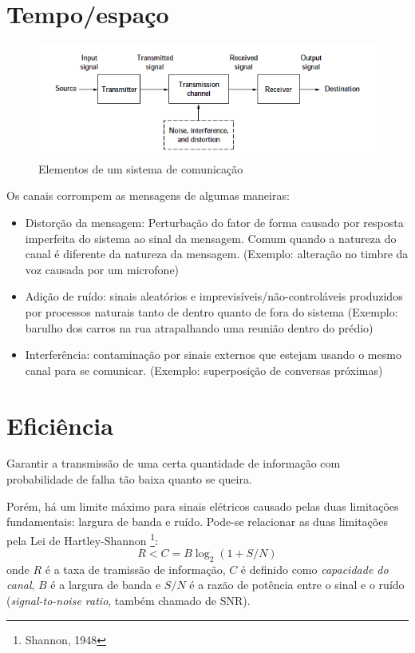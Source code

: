 \documentclass[12pt]{book}
\begin{document}
\section{Tempo/espaço}

\begin{center}
	\begin{figure}[!ht]
		\includegraphics[scale=0.8]{figuras_cap_1/fig1.png}
        \caption{Elementos de um sistema de comunicação}
	\end{figure}
\end{center}
Os canais corrompem as mensagens de algumas maneiras:
\begin{itemize}
\item Distorção da mensagem: Perturbação do fator de forma causado por resposta imperfeita do sistema ao sinal da mensagem. Comum quando a natureza do canal é diferente da natureza da mensagem. (Exemplo: alteração no timbre da voz causada por um microfone)
\item Adição de ruído: sinais aleatórios e imprevisíveis/não-controláveis produzidos por processos naturais tanto de dentro quanto de fora do sistema (Exemplo: barulho dos carros na rua atrapalhando uma reunião dentro do prédio)
\item Interferência: contaminação por sinais externos que estejam usando o mesmo canal para se comunicar. (Exemplo: superposição de conversas próximas)
\end{itemize}

\section{Eficiência}
Garantir a transmissão de uma certa quantidade de informação com probabilidade de falha tão baixa quanto se queira.\par
Porém, há um limite máximo para sinais elétricos causado pelas duas limitações fundamentais: largura de banda e ruído. Pode-se relacionar as duas limitações pela Lei de Hartley-Shannon \footnote{Shannon, 1948}:
\begin{equation}
	R < C = B \log_2(1 + S/N)
\end{equation}
onde $R$ é a taxa de tramissão de informação, $C$ é definido como \textit{capacidade do canal}, $B$ é a largura de banda e $S/N$ é a razão de potência entre o sinal e o ruído (\textit{signal-to-noise ratio}, também chamado de SNR).
\end{document}
